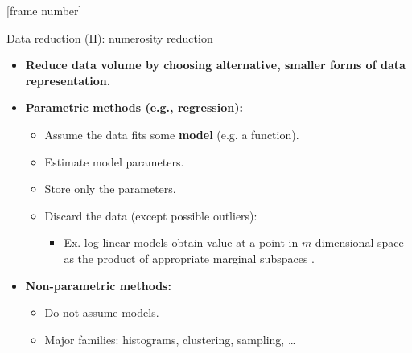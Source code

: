 \documentclass[aspectratio=169,t]{beamer}
\begin{document}
  {
    [frame number]
    \begin{frame}{Data reduction (II): numerosity reduction}
    \begin{itemize}
      \item \textbf{Reduce data volume by choosing alternative, {\color{airforceblue}smaller} forms of data representation.}
      \item \textbf{{\color{airforceblue}Parametric} methods (e.g., regression):}
      \begin{itemize}
        \item Assume the data fits some \textbf{{\color{airforceblue}model}} (e.g. a function).
        \item Estimate model parameters.
        \item Store only the parameters.
        \item Discard the data (except possible outliers):
        \begin{itemize}
          \item Ex. log-linear models-obtain value at a point in $m$-dimensional space as the product of appropriate marginal subspaces .
        \end{itemize}
      \end{itemize}
      \item \textbf{{\color{airforceblue}Non-parametric} methods:}
      \begin{itemize}
        \item Do not assume models.
        \item Major families: histograms, clustering, sampling, \ldots
      \end{itemize}
    \end{itemize}
    \end{frame}
  }
\end{document}
